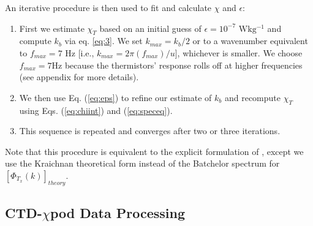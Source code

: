 \documentclass{ametsoc}
\begin{document}
An iterative procedure is then used to fit and calculate $\chi$ and $\epsilon$:

\begin{enumerate}
\item First we estimate $\chi_T$ based on an initial guess of $\epsilon=10^{-7}$ $\mathrm{Wkg^{-1}}$ and compute $k_b$ via eq. \ref{eq:3}. We set $k_{max} = k_b/2$ or to a wavenumber equivalent to $f_{max}=7$ Hz [i.e., $k_{max}= 2\pi(f_{max})/u$], whichever is smaller. We choose $f_{max}=7$Hz because the thermistors' response rolls off at higher frequencies (see appendix for more details).
\item We then use Eq. (\ref{eq:eps}) to refine our estimate of $k_b$ and recompute $\chi_T$ using Eqs. (\ref{eq:chiint}) and (\ref{eq:speceq}). 
\item This sequence is repeated and converges after two or three iterations.
\end{enumerate}
Note that this procedure is equivalent to the explicit formulation of \citep{alfordpinkel00b}, except we use the Kraichnan theoretical form instead of the Batchelor spectrum for $[\Phi_{T_x}(k)]_{theory}$.

\subsection{CTD-$\chi$pod Data Processing}
\end{document}
